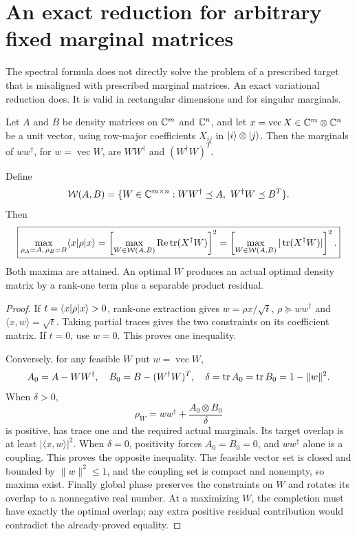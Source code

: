 \section{An exact reduction for arbitrary fixed marginal matrices}\label{sec:reduction}
The spectral formula does not directly solve the problem of a prescribed target that is misaligned with prescribed marginal matrices. An exact variational reduction does. It is valid in rectangular dimensions and for singular marginals.

Let $A$ and $B$ be density matrices on $\mathbb C^m$ and $\mathbb C^n$, and let $x=\operatorname{vec}X\in\mathbb C^m\otimes\mathbb C^n$ be a unit vector, using row-major coefficients $X_{ij}$ in $\lvert i\rangle\otimes\lvert j\rangle$. Then the marginals of $ww^\dagger$, for $w=\operatorname{vec}W$, are $WW^\dagger$ and $(W^\dagger W)^T$.

\begin{theorem}\label{thm:reduction}
Define
\[
 \mathcal W(A,B)=\{W\in\mathbb C^{m\times n}:WW^\dagger\preceq A,\ W^\dagger W\preceq B^T\}.
\]
Then
\begin{equation}\label{eq:reduction}
 \boxed{\max_{\rho_A=A,\,\rho_B=B}\langle x\rvert\rho\lvert x\rangle
 =\left[\max_{W\in\mathcal W(A,B)}\operatorname{Re}\operatorname{tr}(X^\dagger W)\right]^2
 =\left[\max_{W\in\mathcal W(A,B)}|\operatorname{tr}(X^\dagger W)|\right]^2.}
\end{equation}
Both maxima are attained. An optimal $W$ produces an actual optimal density matrix by a rank-one term plus a separable product residual.
\end{theorem}
\begin{proof}
If $t=\langle x\rvert\rho\lvert x\rangle>0$, rank-one extraction gives $w=\rho x/\sqrt t$, $\rho\succeq ww^\dagger$ and $\langle x,w\rangle=\sqrt t$. Taking partial traces gives the two constraints on its coefficient matrix. If $t=0$, use $w=0$. This proves one inequality.

Conversely, for any feasible $W$ put $w=\operatorname{vec}W$,
\[
 A_0=A-WW^\dagger,\quad B_0=B-(W^\dagger W)^T,\quad
 \delta=\operatorname{tr} A_0=\operatorname{tr} B_0=1-\|w\|^2.
\]
When $\delta>0$,
\begin{equation}\label{eq:completion}
 \rho_W=ww^\dagger+\frac{A_0\otimes B_0}{\delta}
\end{equation}
is positive, has trace one and the required actual marginals. Its target overlap is at least $|\langle x,w\rangle|^2$. When $\delta=0$, positivity forces $A_0=B_0=0$, and $ww^\dagger$ alone is a coupling. This proves the opposite inequality. The feasible vector set is closed and bounded by $\|w\|^2\le1$, and the coupling set is compact and nonempty, so maxima exist. Finally global phase preserves the constraints on $W$ and rotates its overlap to a nonnegative real number. At a maximizing $W$, the completion must have exactly the optimal overlap; any extra positive residual contribution would contradict the already-proved equality.
\end{proof}

